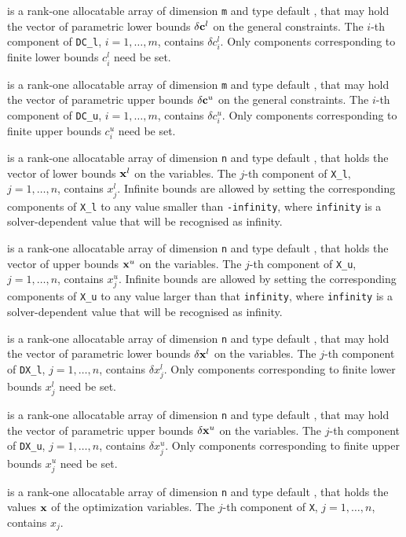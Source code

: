 \documentclass{galahad}
\begin{document}
\begin{description}
 is a rank-one allocatable array of dimension {\tt m} and type
default \realdp, that may hold the vector of parametric lower bounds
$\delta {\mathbf{c}}^{l}$ on the general constraints. The $i$-th component of
{\tt DC\_l}, $i = 1, \ldots , m$, contains $\delta c_{i}^{l}$.
Only components corresponding to finite lower bounds $c_{i}^{l}$
need be set.

 is a rank-one allocatable array of dimension {\tt m} and type
default \realdp, that may hold the vector of parametric upper bounds
$\delta {\mathbf{c}}^{u}$  on the general constraints. The $i$-th component of
{\tt DC\_u}, $i = 1,  \ldots ,  m$, contains $\delta c_{i}^{u}$.
Only components corresponding to finite upper bounds $c_{i}^{u}$
need be set.

 is a rank-one allocatable array of dimension {\tt n} and type
default \realdp, that holds
the vector of lower bounds ${\mathbf{x}}^{l}$ on the variables.
The $j$-th component of {\tt X\_l}, $j = 1, \ldots , n$,
contains $x_{j}^{l}$.
Infinite bounds are allowed by setting the corresponding
components of {\tt X\_l} to any value smaller than {\tt -infinity},
where {\tt infinity} is a  solver-dependent value that will be recognised as
infinity.

 is a rank-one allocatable array of dimension {\tt n} and type
default \realdp, that holds
the vector of upper bounds ${\mathbf{x}}^{u}$ on the variables.
The $j$-th component of {\tt X\_u}, $j = 1, \ldots , n$,
contains $x_{j}^{u}$.
Infinite bounds are allowed by setting the corresponding
components of {\tt X\_u} to any value larger than that {\tt infinity},
where {\tt infinity} is a  solver-dependent value that will be recognised as
infinity.

 is a rank-one allocatable array of dimension {\tt n} and type
default \realdp, that may hold the vector of parametric lower bounds
$\delta {\mathbf{x}}^{l}$ on the variables. The $j$-th component of
{\tt DX\_l}, $j = 1, \ldots , n$, contains $\delta x_{j}^{l}$.
Only components corresponding to finite lower bounds $x_{j}^{l}$
need be set.

 is a rank-one allocatable array of dimension {\tt n} and type
default \realdp, that may hold the vector of parametric upper bounds
$\delta {\mathbf{x}}^{u}$  on the variables. The $j$-th component of
{\tt DX\_u}, $j = 1,  \ldots ,  n$, contains $\delta x_{j}^{u}$.
Only components corresponding to finite upper bounds $x_{j}^{u}$
need be set.

 is a rank-one allocatable array of dimension {\tt n} and type
default \realdp,
that holds the values ${\mathbf{x}}$ of the optimization variables.
The $j$-th component of {\tt X}, $j = 1,  \ldots , n$, contains $x_{j}$.


\end{description}
\end{document}
